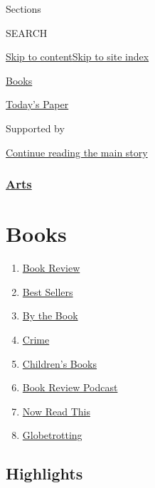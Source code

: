 Sections

SEARCH

\protect\hyperlink{site-content}{Skip to
content}\protect\hyperlink{site-index}{Skip to site index}

\href{https://www.nytimes.com/section/books}{Books}

\href{https://myaccount.nytimes.com/auth/login?response_type=cookie\&client_id=vi}{}

\href{https://www.nytimes.com/section/todayspaper}{Today's Paper}

Supported by

\protect\hyperlink{after-sponsor}{Continue reading the main story}

\hypertarget{arts}{%
\subsubsection{\texorpdfstring{\href{arts}{Arts}}{Arts}}\label{arts}}

\hypertarget{books}{%
\section{Books}\label{books}}

\begin{enumerate}
\def\labelenumi{\arabic{enumi}.}
\tightlist
\item
  \href{/section/books/review}{Book Review}
\item
  \href{/books/best-sellers/}{Best Sellers}
\item
  \href{/column/by-the-book}{By the Book}
\item
  \href{/column/crime}{Crime}
\item
  \href{/column/childrens-books}{Children's Books}
\item
  \href{/column/book-review-podcast}{Book Review Podcast}
\item
  \href{/spotlight/now-read-this}{Now Read This}
\item
  \href{/interactive/2020/01/08/books/new-books-international.html}{Globetrotting}
\end{enumerate}

\hypertarget{highlights}{%
\subsection{Highlights}\label{highlights}}

